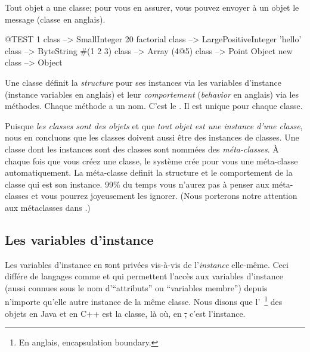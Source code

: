 \documentclass[a4paper,10pt,twoside]{book}
\begin{document}

Tout objet a une classe; pour vous en assurer, vous pouvez envoyer \`a un objet le message  (classe en anglais).

\begin{code}{@TEST}
1 class                 --> SmallInteger 
20 factorial class --> LargePositiveInteger
'hello' class          --> ByteString
#(1 2 3) class       --> Array
(4@5) class         --> Point
Object new class --> Object
\end{code}

Une classe d\'efinit la \emph{structure} pour ses instances via les variables d'instance (instance variables en anglais)
et leur \emph{comportement} (\emph{behavior} en anglais) via les m\'ethodes.
Chaque m\'ethode a un nom. C'est le . Il est unique pour chaque classe.

Puisque \emph{les classes sont des objets} et que \emph{tout objet est une instance d'une classe}, nous en concluons que les classes doivent aussi \^etre des instances de classes.
Une classe dont les instances sont des classes sont nomm\'ees des \emph{m\'eta-classes}.
\`A chaque fois que vous cr\'eez une classe, le syst\`eme cr\'ee pour vous une m\'eta-classe
automatiquement.
La m\'eta-classe definit la structure et le comportement de la classe qui est son instance.
99\% du temps vous n'aurez pas \`a penser aux m\'eta-classes et vous pourrez joyeusement les ignorer.
(Nous porterons notre attention aux m\'etaclasses dans .)

\subsection{Les variables d'instance}

Les variables d'instance en \st sont priv\'ees vis-\`a-vis de l'\emph{instance} elle-m\^eme.
Ceci diff\'ere de langages comme  et  qui permettent l'acc\`es aux variables d'instance (aussi connues sous le nom d'``attributs'' ou ``variables membre'') depuis n'importe qu'elle autre instance de la m\^eme classe.
Nous disons que l'~\footnote{En anglais, encapsulation boundary.} des objets en Java et en C++ est la classe, l\`a o\`u, en \st, c'est l'instance.
\end{document}
